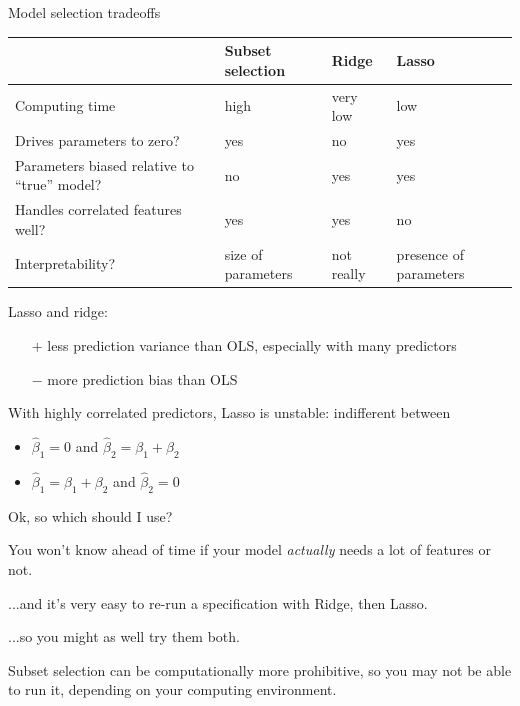 \documentclass[mathserif, handout, aspectratio=169]{beamer}
\begin{document}
\begin{frame}{Model selection tradeoffs}
\begin{table}[]
\begin{tabular}{p{6cm}p{2.2cm}p{2.2cm}p{2.2cm}}
\hline
                                              & Subset selection & Ridge    & Lasso \\ \hline
Computing time             \pause                   & high             & very low & low   \\
Drives parameters to zero?      \pause              & yes              & no       & yes   \\
Parameters biased relative to ``true'' model? \pause & no               & yes      & yes   \\
Handles correlated features well?     \pause        & yes              & yes      & no    \\
Interpretability?	  \pause    & size of parameters & not really  & presence of parameters\\
 \hline
\end{tabular}
\end{table}

Lasso and ridge: 
\begin{itemize}
\item[$+$] less prediction variance than OLS, especially with many  predictors 
\item[$-$] more prediction bias than OLS
\end{itemize}
With highly correlated predictors, Lasso is unstable: indifferent between 
\begin{itemize}
\item $\hat{\beta}_1=0$ and $\hat{\beta}_2= \beta_1+\beta_2$
\item $\hat{\beta}_1= \beta_1+\beta_2$ and $\hat{\beta}_2=0$
\end{itemize}
\end{frame}

\begin{frame}{Ok, so which should I use?}

You won't know ahead of time if your model \textit{actually} needs a lot of features or not.  

\vspace{5mm}

...and it's very easy to re-run a specification with Ridge, then Lasso.

\vspace{5mm}

...so you might as well try them both.

\vspace{5mm}

Subset selection can be computationally more prohibitive, so you may not be able to run it, depending on your computing environment.

\end{frame}
\end{document}

